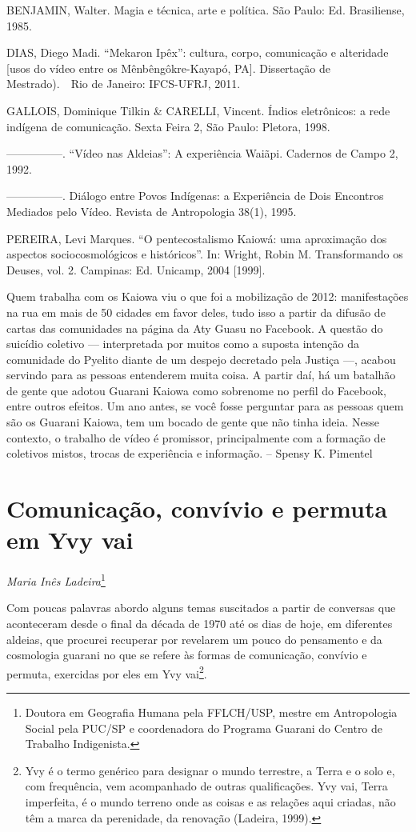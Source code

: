 BENJAMIN, Walter. Magia e técnica, arte e política. São Paulo: Ed.
Brasiliense, 1985.

DIAS, Diego Madi. ``Mekaron Ipêx'': cultura, corpo, comunicação e
alteridade [usos do vídeo entre os Mênbêngôkre-Kayapó, PA]. Dissertação
de Mestrado).\ \ Rio de Janeiro: IFCS-UFRJ, 2011. 

GALLOIS, Dominique Tilkin \& CARELLI, Vincent. Índios eletrônicos: a
rede indígena de comunicação.  Sexta Feira 2, São Paulo: Pletora, 1998.


—————. ``Vídeo nas Aldeias'': A experiência Waiãpi. Cadernos de Campo 2,
1992.

—————. Diálogo entre Povos Indígenas: a Experiência de Dois Encontros
Mediados pelo Vídeo. Revista de Antropologia 38(1), 1995.

PEREIRA, Levi Marques. ``O pentecostalismo Kaiowá: uma aproximação dos
aspectos sociocosmológicos e históricos''. In: Wright, Robin M.
Transformando os Deuses, vol. 2. Campinas: Ed. Unicamp, 2004 [1999].

Quem trabalha com os Kaiowa viu o que foi a mobilização de 2012:
manifestações na rua em mais de 50 cidades em favor deles, tudo isso a
partir da difusão de cartas das comunidades na página da Aty Guasu no
Facebook. A questão do suicídio coletivo — interpretada por muitos como
a suposta intenção da comunidade do Pyelito diante de um despejo
decretado pela Justiça —, acabou servindo para as pessoas entenderem
muita coisa. A partir daí, há um batalhão de gente que adotou Guarani
Kaiowa como sobrenome no perfil do Facebook, entre outros efeitos. Um
ano antes, se você fosse perguntar para as pessoas quem são os Guarani
Kaiowa, tem um bocado de gente que não tinha ideia. Nesse contexto, o
trabalho de vídeo é promissor, principalmente com a formação de
coletivos mistos, trocas de experiência e informação. – Spensy K.
Pimentel 

\chapter{Comunicação, convívio e permuta em Yvy vai}
\begin{flushright}
\emph{Maria Inês Ladeira}\footnote{Doutora em Geografia Humana pela
FFLCH/USP, mestre em Antropologia Social pela PUC/SP e coordenadora do
Programa Guarani do Centro de Trabalho Indigenista.}
\end{flushright}

Com poucas palavras abordo alguns temas suscitados a partir de conversas
que aconteceram desde o final da década de 1970 até os dias de hoje, em
diferentes aldeias, que procurei recuperar por revelarem um pouco do
pensamento e da cosmologia guarani no que se refere às formas de
comunicação, convívio e permuta, exercidas por eles em Yvy
vai\footnote{Yvy é o termo genérico para designar o mundo terrestre, a
Terra e o solo e, com frequência, vem acompanhado de outras
qualificações. Yvy vai, Terra imperfeita, é o mundo terreno onde as
coisas e as relações aqui criadas, não têm a marca da perenidade, da
renovação (Ladeira, 1999).}.  

